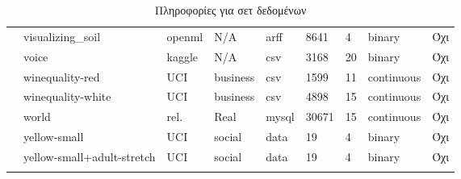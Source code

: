 {\begin{longtable}{|l| l| l | l | l | l |l | l | l | }
 					\rownumber & visualizing\_soil \citep{soil} & openml & N/A & arff & 8641 & 4 & binary & Όχι \\
 					\rownumber & voice \citep{voice} & kaggle & N/A & csv & 3168 & 20 & binary & Όχι \\
 					\rownumber & winequality-red & UCI & business & csv & 1599 & 11 & continuous & Όχι \\
 					\rownumber & winequality-white & UCI & business & csv & 4898 & 15 & continuous & Όχι \\
 					\rownumber & world & rel. & Real & mysql & 30671 & 15 & continuous & Όχι \\
 					\rownumber & yellow-small \citep{balloons}  & UCI & social & data  & 19 & 4 & binary & Όχι\\
 					\rownumber & yellow-small+adult-stretch \citep{balloons}  & UCI & social & data  & 19& 4 & binary & Όχι\\
			\hline   
			\caption{Πληροφορίες για σετ δεδομένων}\label{mfs} 
 \end{longtable}
}
